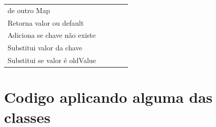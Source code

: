 \documentclass[a4paper,10pt]{article}
\begin{document}
\begin{center}
\begin{longtable}{ |l|c|c|c|c| }
de outro Map \\ Retorna valor ou default \\ Adiciona se chave não existe \\ Substitui valor da chave \\ Substitui se valor é oldValue} \\
    \end{longtable}
    \end{center}

\section{Codigo aplicando alguma das classes}

\end{document}
